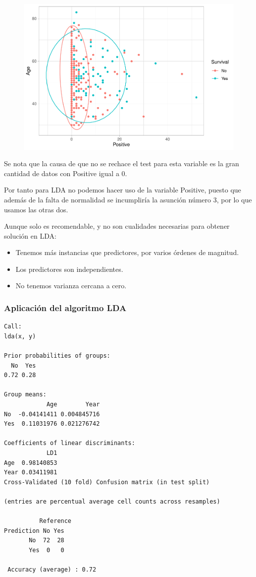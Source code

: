 \begin{figure}[H]\center\includegraphics[width=.8\linewidth]{img/Clasificacion_files/figure-latex/unnamed-chunk-18-3}\caption{}\end{figure}

Se nota que la causa de que no se rechace el test para esta variable es la gran cantidad de datos con Positive igual a 0.

\vspace{\baselineskip}

Por tanto para LDA no podemos hacer uso de la variable Positive, puesto que además de la falta de normalidad se incumpliría la asunción número 3, por lo que usamos las otras dos.

\vspace{\baselineskip}

Aunque solo es recomendable, y no son cualidades necesarias para obtener solución en LDA:
\begin{itemize}
    \item Tenemos más instancias que predictores, por varios órdenes de magnitud.
    \item Los predictores son independientes. 
    \item No tenemos varianza cercana a cero.
\end{itemize}

\subsubsection{Aplicación del algoritmo LDA}

\begin{verbatim}
Call:
lda(x, y)

Prior probabilities of groups:
  No  Yes 
0.72 0.28 

Group means:
            Age        Year
No  -0.04141411 0.004845716
Yes  0.11031976 0.021276742

Coefficients of linear discriminants:
            LD1
Age  0.98140853
Year 0.03411981
Cross-Validated (10 fold) Confusion matrix (in test split) 

(entries are percentual average cell counts across resamples)
 
          Reference
Prediction No Yes
       No  72  28
       Yes  0   0
                          
 Accuracy (average) : 0.72
\end{verbatim}

